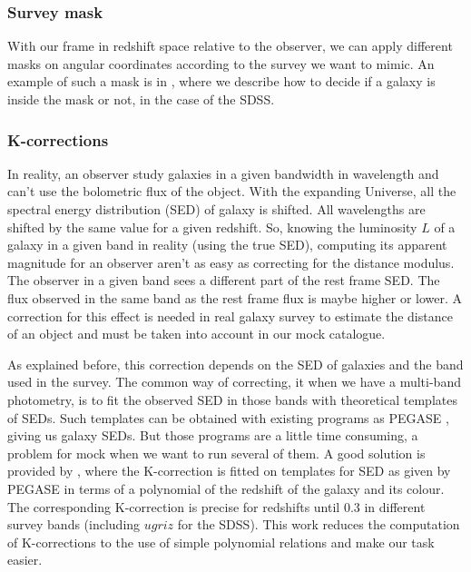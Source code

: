\subsubsection{Survey mask}

With our frame in redshift space relative to the observer, we can apply
different masks on angular coordinates according to the survey we want to
mimic. An example of such a mask is in , where we describe
how to decide if a galaxy is inside the mask or not, in the case of the SDSS\@.

\subsubsection{K-corrections}

In reality, an observer study galaxies in a given bandwidth in wavelength and
can't use the bolometric flux of the object. With the expanding Universe, all
the spectral energy distribution (SED) of galaxy is shifted. All wavelengths
are shifted by the same value for a given redshift. So, knowing the luminosity
$L$ of a galaxy in a given band in reality (using the true SED), computing its
apparent magnitude for an observer aren't as easy as correcting for the
distance modulus. The observer in a given band sees a different part of the
rest frame SED\@. The flux observed in the same band as the rest frame flux is
maybe higher or lower. A correction for this effect is needed in real galaxy
survey to estimate the distance of an object and must be taken into account in
our mock catalogue.

As explained before, this correction depends on the SED of galaxies and the
band used in the survey. The common way of correcting, it when we have a
multi-band photometry, is to fit the observed SED in those bands with
theoretical templates of SEDs. Such templates can be obtained with existing
programs as PEGASE \citep{LeBorgne+04}, giving us galaxy SEDs. But those
programs are a little time consuming, a problem for mock when we want to run
several of them. A good solution is provided by \citet{Chilingarian+10}, where
the K-correction is fitted on templates for SED as given by PEGASE in terms of
a polynomial of the redshift of the galaxy and its colour. The corresponding
K-correction is precise for redshifts until 0.3 in different survey bands
(including $ugriz$ for the SDSS). This work reduces the computation of
K-corrections to the use of simple polynomial relations and make our task
easier.

